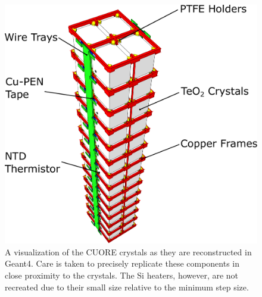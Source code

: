 \begin{figure}[htbp]
    \centering
    \includegraphics[height=0.3\paperheight]{Figures/Crystals_rotated_labelled.pdf}
    \caption[A visualization of the CUORE crystals as they are reconstructed in Geant4.]
    {A visualization of the CUORE crystals as they are reconstructed in Geant4.
    Care is taken to precisely replicate these components in close proximity to the crystals.
    The Si heaters, however, are not recreated due to their small size relative to the minimum step size.}
    \label{fig:CUORE_crystals_MC}
\end{figure}


